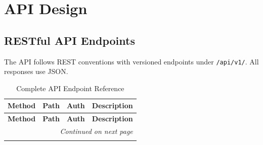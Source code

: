 \documentclass[12pt, a4paper]{report}
\begin{document}
\chapter{API Design}

\section{RESTful API Endpoints}

The API follows REST conventions with versioned endpoints under \texttt{/api/v1/}. All responses use JSON.

\footnotesize
\begin{longtable}{p{1.2cm}|p{4.5cm}|p{0.8cm}|p{5cm}}
\caption{Complete API Endpoint Reference} \label{tab:api} \\
\toprule
\textbf{Method} & \textbf{Path} & \textbf{Auth} & \textbf{Description} \\
\midrule
\endfirsthead
\toprule
\textbf{Method} & \textbf{Path} & \textbf{Auth} & \textbf{Description} \\
\midrule
\endhead
\midrule
\multicolumn{4}{r}{\textit{Continued on next page}} \\
\endfoot
\bottomrule
\endlastfoot


\end{longtable}
\end{document}
